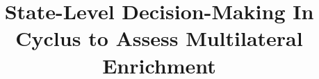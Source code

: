 \documentclass[12pt]{paper}
\begin{document}
\title{State-Level Decision-Making In Cyclus to Assess Multilateral Enrichment}


\date{}


\maketitle

\end{document}
